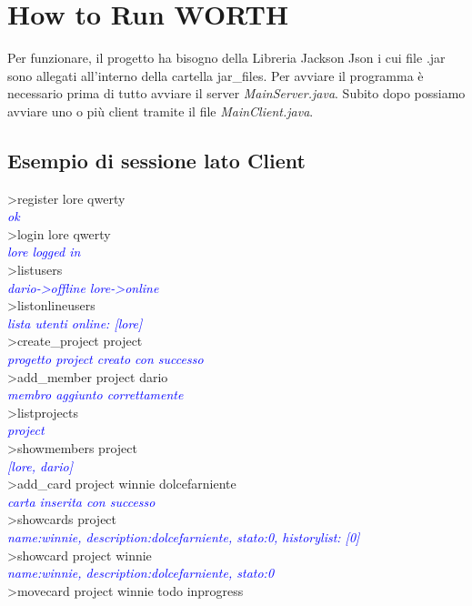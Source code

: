 \documentclass{article} %
\begin{document}
\section{How to Run WORTH}
Per funzionare, il progetto ha bisogno della Libreria Jackson Json i cui file .jar sono allegati all'interno della cartella jar\_files. Per avviare il programma è necessario prima di tutto avviare il server {\itshape MainServer.java}. Subito dopo possiamo avviare uno o più client tramite il file {\itshape MainClient.java}. 
\subsection{Esempio di sessione lato Client}
>register lore qwerty \\
\textcolor{blue}{{\itshape ok}} \\
>login lore qwerty \\
\textcolor{blue}{{\itshape lore logged in}} \\
>listusers \\
\textcolor{blue}{{\itshape dario->offline  lore->online}} \\
>listonlineusers \\
\textcolor{blue}{{\itshape lista utenti online: [lore]}} \\
>create\_project project \\
\textcolor{blue}{{\itshape progetto project creato con successo}} \\
>add\_member project dario \\
\textcolor{blue}{{\itshape membro aggiunto correttamente}} \\
>listprojects \\
\textcolor{blue}{{\itshape project}} \\
>showmembers project \\
\textcolor{blue}{{\itshape [lore, dario]}} \\
>add\_card project winnie dolcefarniente \\
\textcolor{blue}{{\itshape carta inserita con successo}} \\
>showcards project \\
\textcolor{blue}{{\itshape name:winnie, description:dolcefarniente, stato:0, historylist: [0]}} \\
>showcard project winnie \\
\textcolor{blue}{{\itshape name:winnie, description:dolcefarniente, stato:0}} \\
>movecard project winnie todo inprogress \\
\end{document}
